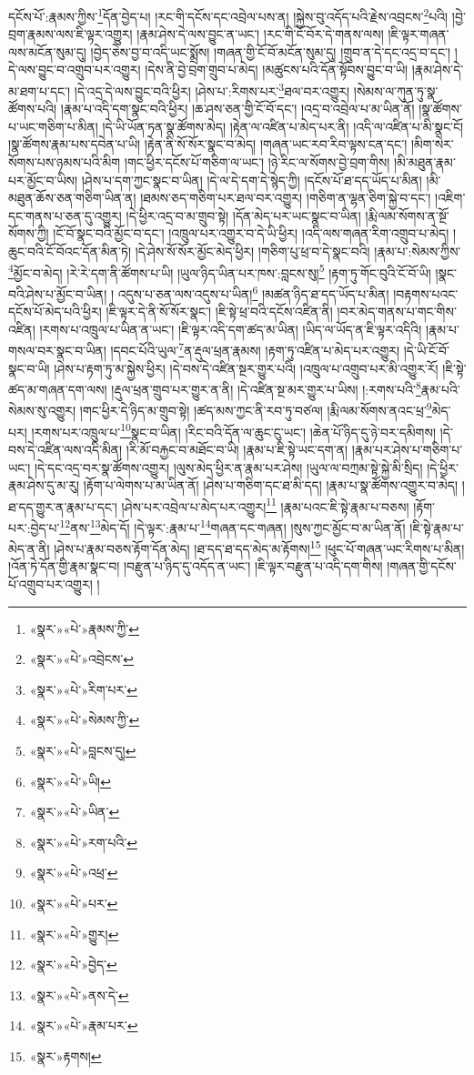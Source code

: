 དངོས་པོ་:རྣམས་ཀྱིས་\footnote{«སྣར་»«པེ་»རྣམས་ཀྱི་}དོན་བྱེད་པ། །རང་གི་དངོས་དང་འབྲེལ་པས་ན། །སྐྱེས་བུ་འདོད་པའི་རྗེས་འབྲངས་\footnote{«སྣར་»«པེ་»འབྲེངས་}པའི། །བྱེ་བྲག་རྣམས་ལས་ཇི་ལྟར་འགྱུར། །རྣམ་ཤེས་དེ་ལས་བྱུང་ན་ཡང་། །རང་གི་ངོ་བོར་དེ་གནས་ལས། །ཇི་ལྟར་གཞན་ལས་མངོན་སུམ་དུ། །བྱེད་ཅེས་བྱ་བ་འདི་ཡང་སྨྲོས། །གཞན་གྱི་ངོ་བོ་མངོན་སུམ་དུ། །གྲུབ་ན་དེ་དང་འདྲ་བ་དང་། །དེ་ལས་བྱུང་བ་འགྲུབ་པར་འགྱུར། །དེས་ནི་བྱེ་བྲག་གྲུབ་པ་མེད། །མཚུངས་པའི་དོན་སྟོབས་བྱུང་བ་ཡི། །རྣམ་ཤེས་དེ་མ་ཐག་པ་དང་། །དེ་འདྲ་དེ་ལས་བྱུང་བའི་ཕྱིར། །ཤེས་པ་:རིགས་པར་\footnote{«སྣར་»«པེ་»རིག་པར་}ཐལ་བར་འགྱུར། །སེམས་ལ་ཀུན་ཏུ་སྣ་ཚོགས་པའི། །རྣམ་པ་འདི་དག་སྣང་བའི་ཕྱིར། །ཆ་ཤས་ཅན་གྱི་ངོ་བོ་དང་། །འདྲ་བ་འབྲེལ་པ་མ་ཡིན་ནོ། །སྣ་ཚོགས་པ་ཡང་གཅིག་པ་མིན། །དེ་ཡི་ཡོན་ཏན་སྣ་ཚོགས་མེད། །རྟེན་ལ་འཛིན་པ་མེད་པར་ནི། །འདི་ལ་འཛིན་པ་མི་སྣང་ངོ། །སྣ་ཚོགས་རྣམ་པས་དབེན་པ་ཡི། །རྟེན་ནི་སོ་སོར་སྣང་བ་མེད། །གཞན་ཡང་རབ་རིབ་ལྟས་ངན་དང་། །མིག་སེར་སོགས་པས་ཉམས་པའི་མིག །གང་ཕྱིར་དངོས་པོ་གཅིག་ལ་ཡང་། །ཉེ་རིང་ལ་སོགས་བྱེ་བྲག་གིས། །མི་མཐུན་རྣམ་པར་མྱོང་བ་ཡིས། །ཤེས་པ་དག་ཀྱང་སྣང་བ་ཡིན། །དེ་ལ་དེ་དག་དེ་སྙེད་ཀྱི། །དངོས་པོ་ཐ་དད་ཡོད་པ་མིན། །མི་མཐུན་ཆོས་ཅན་གཅིག་ཡིན་ན། །ཐམས་ཅད་གཅིག་པར་ཐལ་བར་འགྱུར། །གཅིག་ན་ལྷན་ཅིག་སྐྱེ་བ་དང་། །འཇིག་དང་གནས་པ་ཅན་དུ་འགྱུར། །དེ་ཕྱིར་འདྲ་བ་མ་གྲུབ་སྟེ། །དོན་མེད་པར་ཡང་སྣང་བ་ཡིན། །རྨི་ལམ་སོགས་ན་སྔོ་སོགས་ཀྱི། །ངོ་བོ་སྣང་བའི་མྱོང་བ་དང་། །འཁྲུལ་པར་འགྱུར་བ་དེ་ཡི་ཕྱིར། །འདི་ལས་གཞན་རིག་འགྲུབ་པ་མེད། །ཆུང་བའི་ངོ་བོའང་དོན་མིན་ཏེ། །དེ་ཤེས་སོ་སོར་མྱོང་མེད་ཕྱིར། །གཅིག་པུ་ཕྲ་བ་དེ་སྣང་བའི། །རྣམ་པ་:སེམས་ཀྱིས་\footnote{«སྣར་»«པེ་»སེམས་ཀྱི་}མྱོང་བ་མེད། །རེ་རེ་དག་ནི་ཚོགས་པ་ཡི། །ཡུལ་ཉིད་ཡིན་པར་ཁས་:བླངས་སུ།\footnote{«སྣར་»«པེ་»བླངས་དུ།} །རྟག་ཏུ་གོང་བུའི་ངོ་བོ་ཡི། །སྣང་བའི་ཤེས་པ་མྱོང་བ་ཡིན། །
འདུས་པ་ཅན་ལས་འདུས་པ་ཡིན།\footnote{«སྣར་»«པེ་»ཡི།} །མཚན་ཉིད་ཐ་དད་ཡོད་པ་མིན། །བརྟགས་པའང་དངོས་པོ་མེད་པའི་ཕྱིར། །ཇི་ལྟར་དེ་ནི་སོ་སོར་སྣང་། །ཇི་སྟེ་ཕྲ་བའི་དངོས་འཛིན་ནི། །བར་མེད་གནས་པ་གང་གིས་འཛིན། །རགས་པ་འཁྲུལ་པ་ཡིན་ན་ཡང་། །ཇི་ལྟར་འདི་དག་ཚད་མ་ཡིན། །ཡིད་ལ་ཡོད་ན་ཇི་ལྟར་འདིའི། །རྣམ་པ་གསལ་བར་སྣང་བ་ཡིན། །དབང་པོའི་ཡུལ་\footnote{«སྣར་»«པེ་»ཡིན་}ན་རྡུལ་ཕྲན་རྣམས། །རྟག་ཏུ་འཛིན་པ་མེད་པར་འགྱུར། །དེ་ཡི་ངོ་བོ་སྣང་བ་ཡི། །ཤེས་པ་རྟག་ཏུ་མ་སྐྱེས་ཕྱིར། །དེ་བས་དེ་འཛིན་སྔར་གྱུར་པའི། །འཁྲུལ་པ་འགྲུབ་པར་མི་འགྱུར་རོ། །ཇི་སྟེ་ཚད་མ་གཞན་དག་ལས། །རྡུལ་ཕྲན་གྲུབ་པར་གྱུར་ན་ནི། །དེ་འཛིན་སྔ་མར་གྱུར་པ་ཡིས། །:རགས་པའི་\footnote{«སྣར་»«པེ་»རག་པའི་}རྣམ་པའི་སེམས་སུ་འགྱུར། །གང་ཕྱིར་དེ་ཉིད་མ་གྲུབ་སྟེ། །ཚད་མས་ཀྱང་ནི་རབ་ཏུ་བཙལ། །རྨི་ལམ་སོགས་ནའང་ཕྲ་\footnote{«སྣར་»«པེ་»འཕྲ་}མེད་པར། །རགས་པར་འཁྲུལ་པ་\footnote{«སྣར་»«པེ་»པར་}སྣང་བ་ཡིན། །རིང་བའི་དོན་ལ་ཆུང་ངུ་ཡང་། །ཆེན་པོ་ཉིད་དུ་ཉེ་བར་དམིགས། །དེ་བས་དེ་འཛིན་ལས་འདི་མིན། །རི་མོ་བརྐྱང་བ་མཐོང་བ་ཡི། །རྣམ་པ་ཇི་སྟེ་ཡང་དག་ན། །རྣམ་པར་ཤེས་པ་གཅིག་པ་ཡང་། །དེ་དང་འདྲ་བར་སྣ་ཚོགས་འགྱུར། །ལུས་མེད་ཕྱིར་ན་རྣམ་པར་ཤེས། །ཡུལ་ལ་བཀྲམ་སྟེ་སྐྱེ་མི་སྲིད། །དེ་ཕྱིར་རྣམ་ཤེས་དུ་མ་རུ། །རྟོག་པ་ལེགས་པ་མ་ཡིན་ནོ། །ཤེས་པ་གཅིག་དང་ཐ་མི་དད། །རྣམ་པ་སྣ་ཚོགས་འགྱུར་བ་མེད། །ཐ་དད་གྱུར་ན་རྣམ་པ་དང་། །ཤེས་པར་འབྲེལ་པ་མེད་པར་འགྱུར།\footnote{«སྣར་»«པེ་»གྱུར།} །རྣམ་པའང་ཇི་སྟེ་རྣམ་པ་བཅས། །རྟོག་པར་:བྱེད་པ་\footnote{«སྣར་»«པེ་»བྱེད་}ནས་\footnote{«སྣར་»«པེ་»ནས་དེ་}མེད་དོ། །དེ་ལྟར་:རྣམ་པ་\footnote{«སྣར་»«པེ་»རྣམ་པར་}གཞན་དང་གཞན། །སུས་ཀྱང་མྱོང་བ་མ་ཡིན་ནོ། །ཇི་སྟེ་རྣམ་པ་མེད་ན་ནི། །ཤེས་པ་རྣམ་བཅས་རྟོག་དོན་མེད། །ཐ་དད་ཐ་དད་མེད་མ་རྟོགས།\footnote{«སྣར་»རྟགས།} །ཕུང་པོ་གཞན་ཡང་རིགས་པ་མིན། །འོན་ཏེ་དོན་གྱི་རྣམ་སྣང་བ། །བརྫུན་པ་ཉིད་དུ་འདོད་ན་ཡང་། །ཇི་ལྟར་བརྫུན་པ་འདི་དག་གིས། །གཞན་གྱི་དངོས་པོ་འགྲུབ་པར་འགྱུར། །
